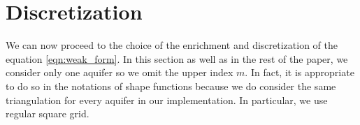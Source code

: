 \documentclass{elsarticle}
\def\vc#1{\mathbf{\boldsymbol{#1}}}     %
\newcommand{\dd}{\; \mathrm{d}}
\newcommand{\bx}{\vc{x}}
\begin{document}

\section{Discretization}
\label{sec:discretization}
We can now proceed to the choice of the enrichment and discretization of the equation
\eqref{eqn:weak_form}.
In this section as well as in the rest of the paper, we consider only one aquifer so we omit the upper index $m$.
In fact, it is appropriate to do so in the notations of shape functions because we do consider the same 
triangulation for every aquifer in our implementation. In particular, we use regular square grid.
\end{document}
